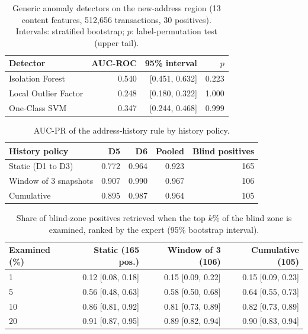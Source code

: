 \begin{table}[t]
\centering
\caption{Generic anomaly detectors on the new-address region (13 content features, 512,656 transactions, 30 positives). Intervals: stratified bootstrap; $p$: label-permutation test (upper tail).}
\label{tab:detectors}
\begin{tabular}{lrrr}
\toprule
Detector & AUC-ROC & 95\% interval & $p$ \\
\midrule
Isolation Forest & 0.540 & [0.451, 0.632] & 0.223 \\
Local Outlier Factor & 0.248 & [0.180, 0.322] & 1.000 \\
One-Class SVM & 0.347 & [0.244, 0.468] & 0.999 \\
\bottomrule
\end{tabular}
\end{table}

\begin{table}[t]
\centering
\caption{AUC-PR of the address-history rule by history policy.}
\label{tab:refresh}
\begin{tabular}{lrrrr}
\toprule
History policy & D5 & D6 & Pooled & Blind positives \\
\midrule
Static (D1 to D3) & 0.772 & 0.964 & 0.923 & 165 \\
Window of 3 snapshots & 0.907 & 0.990 & 0.967 & 106 \\
Cumulative & 0.895 & 0.987 & 0.964 & 105 \\
\bottomrule
\end{tabular}
\end{table}

\begin{table}[t]
\centering
\caption{Share of blind-zone positives retrieved when the top $k\%$ of the blind zone is examined, ranked by the expert (95\% bootstrap interval).}
\label{tab:workload}
\begin{tabular}{lrrr}
\toprule
Examined (\%) & Static (165 pos.) & Window of 3 (106) & Cumulative (105) \\
\midrule
1 & 0.12 [0.08, 0.18] & 0.15 [0.09, 0.22] & 0.15 [0.09, 0.23] \\
5 & 0.56 [0.48, 0.63] & 0.58 [0.50, 0.68] & 0.64 [0.55, 0.73] \\
10 & 0.86 [0.81, 0.92] & 0.81 [0.73, 0.89] & 0.82 [0.73, 0.89] \\
20 & 0.91 [0.87, 0.95] & 0.89 [0.82, 0.94] & 0.90 [0.83, 0.94] \\
\bottomrule
\end{tabular}
\end{table}


